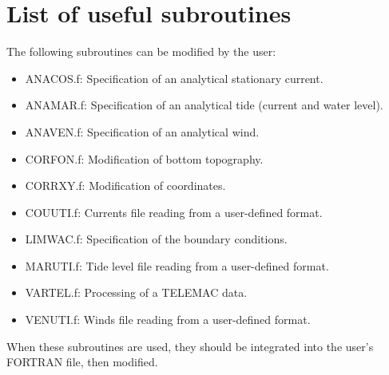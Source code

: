 \section{List of useful subroutines}
\label{se:usefulsub}

 The following subroutines can be modified by the user:

\begin{itemize}
\item  ANACOS.f:  Specification of an analytical stationary current.

\item  ANAMAR.f:  Specification of an analytical tide (current and water level).

\item  ANAVEN.f:  Specification of an analytical wind.

\item  CORFON.f:  Modification of bottom topography.

\item  CORRXY.f:  Modification of coordinates.

\item  COUUTI.f:  Currents file reading from a user-defined format.

\item  LIMWAC.f:  Specification of the boundary conditions.

\item  MARUTI.f:  Tide level file reading from a user-defined format.

\item  VARTEL.f:  Processing of a TELEMAC data.

\item  VENUTI.f:  Winds file reading from a user-defined format.
\end{itemize}

 When these subroutines are used, they should be integrated into the user's FORTRAN file, then modified.

